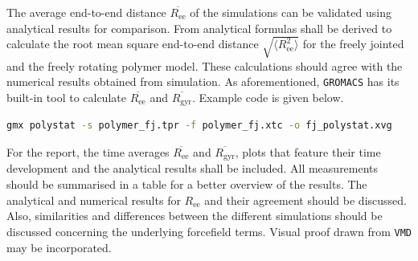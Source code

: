 \documentclass[9pt,tutorial]{livecoms}
\begin{document}
The average end-to-end distance $\overline{R_\text{ee}}$ of the simulations can be validated using analytical results for comparison. From  analytical formulas shall be derived to calculate the root mean square end-to-end distance $\sqrt{\langle R_\text{ee}^2 \rangle}$ for the freely jointed and the freely rotating polymer model. These calculations should agree with the numerical results obtained from simulation. As aforementioned, \texttt{GROMACS} has its built-in tool to calculate $\overline{R_\text{ee}}$ and $\overline{R_\text{gyr}}$. Example code is given below.
\begin{lstlisting}[language=bash]
gmx polystat -s polymer_fj.tpr -f polymer_fj.xtc -o fj_polystat.xvg
\end{lstlisting}
For the report, the time averages $\overline{R_\text{ee}}$ and $\overline{R_\text{gyr}}$, plots that feature their time development and the analytical results shall be included. All measurements should be summarised in a table for a better overview of the results. The analytical and numerical results for $R_\text{ee}$ and their agreement should be discussed. Also, similarities and differences between the different simulations should be discussed concerning the underlying forcefield terms. Visual proof drawn from \texttt{VMD} may be incorporated.
\end{document}
